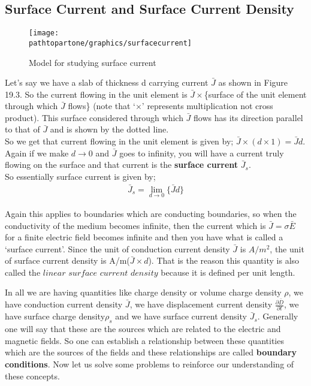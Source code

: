 \subsection{Surface Current and Surface Current Density}
\begin{figure}[h]
	\centering
	\texttt{[image: \\pathtopartone/graphics/surfacecurrent]}
	\caption{Model for studying surface current}
\end{figure} 


Let's say we have a slab of thickness d carrying current $\bar{J}$ as shown in Figure 19.3. So the current flowing in the unit element is $\bar{J}\times$\{surface of the unit element through which $\bar{J}$ flows\} (note that `$\times$' represents multiplication not cross product).
This surface considered through which $\bar{J}$ flows has its direction parallel to that of $\bar{J}$ and is shown by the dotted line.\\ 
So we get that current flowing in the unit element is given by; $\bar{J}\times(d\times1)=\bar{J}d$. Again if we make $d\rightarrow0$ and $\bar{J}$ goes to infinity, you will have a current truly flowing on the surface and that current is the \textbf{surface current} $\bar{J}_{s}$. \\
So essentially surface current is given by;
\begin{align}
	\bar{J}_{s}=\lim_{d\rightarrow0}\{\bar{J}d\}
\end{align}


Again this applies to boundaries which are conducting boundaries, so when the conductivity of the medium becomes infinite, then the current which is $\bar{J}=\sigma\bar{E}$ for a finite electric field becomes infinite and then you have what is called a `surface current'. Since the unit of conduction current density $\bar{J}$ is $A/m^{2}$, the unit of surface current density is A/m($\bar{J}\times d$). That is the reason this quantity is also called the $linear$ $surface$ $current$ $density$ because it is defined per unit length.


In all we are having quantities like charge density or volume charge density $\rho$, we have conduction current density $\bar{J}$, we have displacement current density $\frac{\partial\bar{D}}{\partial t}$, we have surface charge density$\rho_{s}$ and we have surface current density $\bar{J}_{s}$. Generally one will say that these are the sources which are related to the electric and magnetic fields. So one can establish a relationship between these quantities which are the sources of the fields and these relationships are called \textbf{ boundary conditions}. Now let us solve some problems to reinforce our understanding of these concepts.

